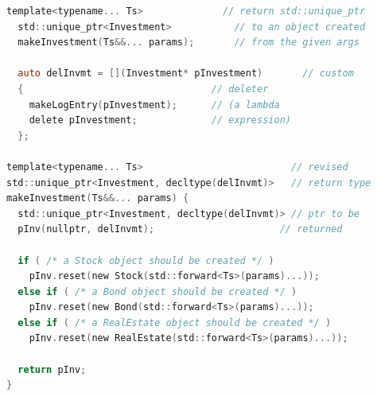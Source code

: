 \documentclass[a4paper]{exam}
\theoremstyle{definition}
\begin{document}
\begin{lstlisting}[language=C]
  template<typename... Ts>              // return std::unique_ptr
  std::unique_ptr<Investment>           // to an object created
  makeInvestment(Ts&&... params);       // from the given args

  auto delInvmt = [](Investment* pInvestment)       // custom
  {                                 // deleter
    makeLogEntry(pInvestment);      // (a lambda
    delete pInvestment;             // expression)
  };

template<typename... Ts>                          // revised
std::unique_ptr<Investment, decltype(delInvmt)>   // return type
makeInvestment(Ts&&... params) {
  std::unique_ptr<Investment, decltype(delInvmt)> // ptr to be
  pInv(nullptr, delInvmt);                      // returned

  if ( /* a Stock object should be created */ ) 
    pInv.reset(new Stock(std::forward<Ts>(params)...));
  else if ( /* a Bond object should be created */ ) 
    pInv.reset(new Bond(std::forward<Ts>(params)...));
  else if ( /* a RealEstate object should be created */ ) 
    pInv.reset(new RealEstate(std::forward<Ts>(params)...));

  return pInv;
}
\end{lstlisting}
\end{document}
